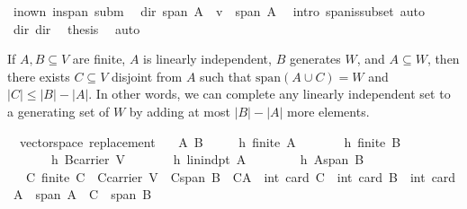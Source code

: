 \begin{isabellebody}
\ inown\ inspan\ subm\ \isamarkupfalse%
\ dir{}{\isacharcolon}\ {\isachardoublequoteopen}span\ {\isacharparenleft}A\ {\isasymunion}\ {\isacharbraceleft}v{\isacharbraceright}{\isacharparenright}\ {\isasymsubseteq}\ span\ A{\isachardoublequoteclose}\ \isamarkupfalse%
\ {\isacharparenleft}intro\ span{\isacharunderscore}is{\isacharunderscore}subset{\isacharcomma}\ auto{\isacharparenright}\ \isanewline
\isanewline
\ \ \isamarkupfalse%
\ dir{}\ dir{}\ \isamarkupfalse%
\ {\isacharquery}thesis\ \isamarkupfalse%
\ auto\isanewline
{}\isamarkupfalse%
%
\endisatagproof
{\isafoldproof}%
%
\isadelimproof
%
\endisadelimproof
%
\isamarkuptrue%
%
\begin{isamarkuptext}%
If $A,B\subseteq V$ are finite, $A$ is linearly independent, $B$ generates $W$, 
and $A\subseteq W$, then there exists $C\subseteq V$ disjoint from $A$ such that
$\text{span}(A\cup C) = W$ and $|C|\le |B|-|A|$. In other words, we can complete
any linearly independent set to a generating set of $W$ by adding at most $|B|-|A|$ more elements.%
\end{isamarkuptext}%
\isamarkuptrue%
\isamarkupfalse%
\ {\isacharparenleft}\ vectorspace{\isacharparenright}\ replacement{\isacharcolon}\isanewline
\ \ \ A\ B\ \ \isanewline
\ \ \ h{}{\isacharcolon}\ {\isachardoublequoteopen}finite\ A{\isachardoublequoteclose}\isanewline
\ \ \ \ \ \ \ h{}{\isacharcolon}\ {\isachardoublequoteopen}finite\ B{\isachardoublequoteclose}\isanewline
\ \ \ \ \ \ \ h{}{\isacharcolon}\ {\isachardoublequoteopen}B{\isasymsubseteq}carrier\ V{\isachardoublequoteclose}\isanewline
\ \ \ \ \ \ \ h{}{\isacharcolon}\ {\isachardoublequoteopen}lin{\isacharunderscore}indpt\ A{\isachardoublequoteclose}\ \isanewline
\ \ \ \ \ \ \ h{}{\isacharcolon}\ {\isachardoublequoteopen}A{\isasymsubseteq}span\ B{\isachardoublequoteclose}\ \isanewline
\ \ \ {\isachardoublequoteopen}{\isasymexists}C{\isachardot}\ finite\ C\ {\isasymand}\ C{\isasymsubseteq}carrier\ V\ {\isasymand}\ C{\isasymsubseteq}span\ B\ {\isasymand}\ C{\isasyminter}A{\isacharequal}{\isacharbraceleft}{\isacharbraceright}\ {\isasymand}\ int\ {\isacharparenleft}card\ C{\isacharparenright}\ {\isasymle}\ {\isacharparenleft}int\ {\isacharparenleft}card\ B{\isacharparenright}{\isacharparenright}\ {\isacharminus}\ {\isacharparenleft}int\ {\isacharparenleft}card\ A{\isacharparenright}{\isacharparenright}\ {\isasymand}\ {\isacharparenleft}span\ {\isacharparenleft}A\ {\isasymunion}\ C{\isacharparenright}\ {\isacharequal}\ span\ B{\isacharparenright}{\isachardoublequoteclose}\ \isanewline

\end{isabellebody}
